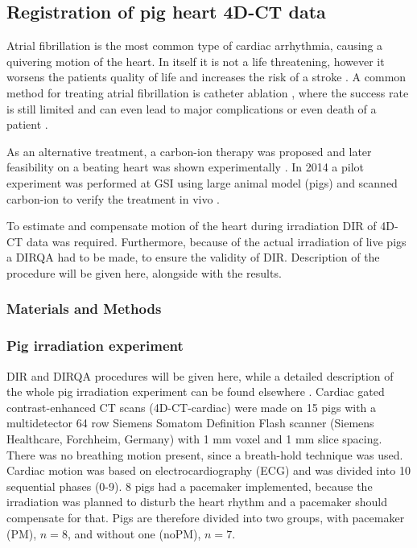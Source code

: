 \documentclass[type=dr, dr=rernat, accentcolor=tud7b,colorbacktitle, bigchapter, openright, twoside, 12pt ]{tudthesis}
\begin{document}
\newpage
\subsection{Registration of pig heart 4D-CT data}

Atrial fibrillation is the most common type of cardiac arrhythmia, causing a quivering motion of the heart. In itself it is not a life threatening, however it worsens the patients quality of life and increases the risk of a stroke \cite{Benjamin1998}. A common method for treating atrial fibrillation is catheter ablation \cite{January2014}, 
where the success rate is still limited and can even lead to major complications or even death of a patient \cite{Cappato2005,Cappato2010}.

As an alternative treatment, a carbon-ion therapy was proposed \cite{Bert2012} and later feasibility on a beating heart was shown experimentally \cite{Lehmann2015b}. In 2014 a pilot experiment was performed at GSI using large animal model (pigs) and
scanned carbon-ion to verify the treatment in vivo \cite{Lehmann2015}.

To estimate and compensate motion of the heart during irradiation DIR of 4D-CT data was required. Furthermore, because of the actual irradiation of live pigs a DIRQA had to be made, to ensure the validity of DIR. Description of the procedure will be given here,
alongside with the results.


\subsubsection{Materials and Methods}


\subsubsection{Pig irradiation experiment}

DIR and DIRQA procedures will be given here, while a detailed description of the whole pig irradiation experiment can be found elsewhere \cite{Lehmann2015}. Cardiac gated contrast-enhanced CT scans (4D-CT-cardiac) were made on 15 pigs with a multidetector 64 row Siemens Somatom Definition Flash scanner 
(Siemens Healthcare, Forchheim, Germany) with 1 mm voxel and 1 mm slice spacing. There was no breathing motion present, since a breath-hold technique was used. Cardiac motion was based on electrocardiography (ECG)
and was divided into 10 sequential phases (0-9). 
8 pigs had a pacemaker implemented, because the irradiation was planned to disturb the heart rhythm and a pacemaker should compensate for that. Pigs are therefore divided into two groups, with pacemaker (PM), $n=8$, and without one (noPM), $n=7$.
\end{document}
